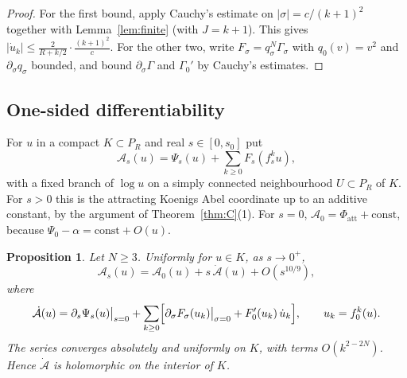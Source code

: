 \documentclass[11pt]{amsart}
\newtheorem{proposition}[theorem]{Proposition}
\theoremstyle{definition}
\begin{document}
\begin{proof}
For the first bound, apply Cauchy's estimate on $|\sigma|=c/(k+1)^2$ together
with Lemma~\ref{lem:finite} (with $J=k+1$).  This gives
$|\dot u_k|\le\frac{2}{R+k/2}\cdot\frac{(k+1)^2}{c}$.  For the other two, write
$F_\sigma=q_\sigma^N\Gamma_\sigma$ with $q_0(v)=v^2$ and $\partial_\sigma q_\sigma$
bounded, and bound $\partial_\sigma\Gamma$ and $\Gamma_0'$ by Cauchy's estimates.
\end{proof}

\subsection{One-sided differentiability}
For $u$ in a compact $K\subset P_R$ and real $s\in[0,s_0]$ put
\[
 \mathcal A_s(u)=\Psi_s(u)+\sum_{k\ge0}F_s(f_s^ku),
\]
with a fixed branch of $\log u$ on a simply connected neighbourhood $U\subset P_R$
of $K$.  For $s>0$ this is the attracting Koenigs Abel coordinate up to an
additive constant, by the argument of Theorem~\ref{thm:C}(1).  For $s=0$,
$\mathcal A_0=\Phi_{\mathrm{att}}+\mathrm{const}$, because
$\Psi_0-\alpha=\mathrm{const}+O(u)$.

\begin{proposition}\label{prop:diff}
Let $N\ge3$.  Uniformly for $u\in K$, as $s\to0^+$,
\[
 \mathcal A_s(u)=\mathcal A_0(u)+s\,\dot{\mathcal A}(u)+O(s^{10/9}),
\]
where
\begin{equation}\label{eq:Adot}
 \dot{\mathcal A}(u)=\partial_s\Psi_s(u)\big|_{s=0}
 +\sum_{k\ge0}\Bigl[\partial_\sigma F_\sigma(u_k)\big|_{\sigma=0}
 +F_0'(u_k)\,\dot u_k\Bigr],\qquad u_k=f_0^k(u).
\end{equation}
The series converges absolutely and uniformly on $K$, with terms
$O(k^{2-2N})$.  Hence $\dot{\mathcal A}$ is holomorphic on the interior of
$K$.
\end{proposition}
\end{document}
